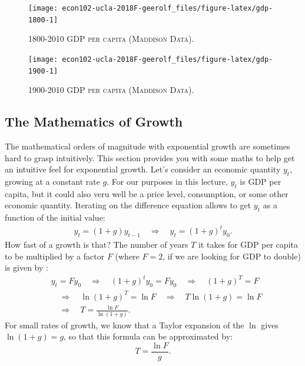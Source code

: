 \documentclass[]{book}
\theoremstyle{definition}
\theoremstyle{definition}
\theoremstyle{definition}
\theoremstyle{remark}
\begin{document}
\begin{figure}

{\centering \texttt{[image: econ102-ucla-2018F-geerolf\_files/figure-latex/gdp-1800-1]} 

}

\caption{\textsc{1800-2010 GDP per capita (Maddison Data)}.}\label{fig:gdp-1800}
\end{figure}



\begin{figure}

{\centering \texttt{[image: econ102-ucla-2018F-geerolf\_files/figure-latex/gdp-1900-1]} 

}

\caption{\textsc{1900-2010 GDP per capita (Maddison Data)}.}\label{fig:gdp-1900}
\end{figure}

\subsection{The Mathematics of Growth}\label{the-mathematics-of-growth}

The mathematical orders of magnitude with exponential growth are
sometimes hard to grasp intuitively. This section provides you with some
maths to help get an intuitive feel for exponential growth. Let's
consider an economic quantity \(y_t\), growing at a constant rate \(g\).
For our purposes in this lecture, \(y_t\) is GDP per capita, but it
could also veru well be a price level, consumption, or some other
economic quantity. Iterating on the difference equation allows to get
\(y_t\) as a function of the initial value: \[
\begin{aligned}
y_t = (1+g)y_{t-1} \quad \Rightarrow \quad y_t = (1+g)^t y_0.
\end{aligned}
\] How fast of a growth is that? The number of years \(T\) it takes for
GDP per capita to be multiplied by a factor \(F\) (where \(F=2\), if we
are looking for GDP to double) is given by : \[
\begin{aligned}
&y_t = F y_0 \quad \Rightarrow \quad (1+g)^t y_0 = F y_0 \quad \Rightarrow \quad (1+g)^T = F \\
& \quad \Rightarrow \quad \ln (1+g)^T = \ln F \quad \Rightarrow \quad T \ln (1+g) = \ln F \\
& \quad \Rightarrow \quad T=\frac{\ln F}{\ln(1+g)}.
\end{aligned}
\] For small rates of growth, we know that a Taylor expansion of the
\(\ln\) gives \(\ln(1+g)=g\), so that this formula can be approximated
by: \[T = \frac{\ln F}{g}.\]
\end{document}
